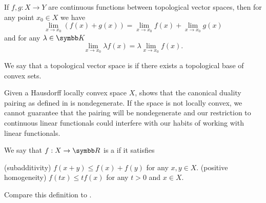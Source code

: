 \begin{corollary}\label{thm:linearity_of_function_limits}
  If \( f, g: X \to Y \) are continuous functions between topological vector spaces, then for any point \( x_0 \in X \) we have
  \begin{equation*}
    \lim_{x \to x_0} (f(x) + g(x)) = \lim_{x \to x_0} f(x) + \lim_{x \to x_0} g(x)
  \end{equation*}
  and for any \( \lambda \in \BK \)
  \begin{equation*}
    \lim_{x \to x_0} \lambda f(x) = \lambda \lim_{x \to x_0} f(x).
  \end{equation*}
\end{corollary}

\begin{definition}\label{def:locally_convex_space}\cite[1.8]{Rudin1991}
  We say that a topological vector space is  if there exists a topological base of convex sets.
\end{definition}

\begin{remark}\label{def:locally_convex_duality_pairing}
  Given a Hausdorff locally convex space \( X \),  shows that the canonical duality pairing as defined in  is nondegenerate. If the space is not locally convex, we cannot guarantee that the pairing will be nondegenerate and our restriction to continuous linear functionals could interfere with our habits of working with linear functionals.
\end{remark}

\begin{definition}\label{def:sublinear_functional}
  We say that \( f: X \to \BR \) is a  if it satisfies
  \begin{defenum}
    (subadditivity) \( f(x + y) \leq f(x) + f(y) \) for any \( x, y \in X \).
    (positive homogeneity) \( f(tx) \leq t f(x) \) for any \( t > 0 \) and \( x \in X \).
  \end{defenum}

  Compare this definition to .
\end{definition}
